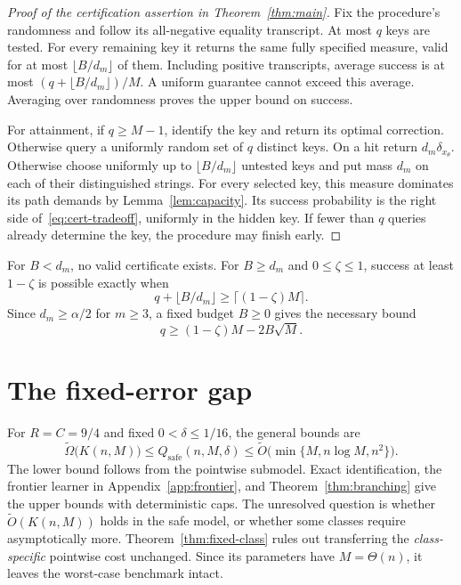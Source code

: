 \documentclass[11pt]{article}
\theoremstyle{definition}\newtheorem{definition}[theorem]{Definition}
\theoremstyle{remark}\newtheorem{remark}[theorem]{Remark}
\begin{document}
\begin{proof}[Proof of the certification assertion in Theorem~\ref{thm:main}]
Fix the procedure's randomness and follow its all-negative equality transcript. At most $q$ keys are tested. For every remaining key it returns the same fully specified measure, valid for at most $\lfloor B/d_m\rfloor$ of them. Including positive transcripts, average success is at most $(q+\lfloor B/d_m\rfloor)/M$. A uniform guarantee cannot exceed this average. Averaging over randomness proves the upper bound on success.

For attainment, if $q\ge M-1$, identify the key and return its optimal correction. Otherwise query a uniformly random set of $q$ distinct keys. On a hit return $d_m\delta_{x_\theta}$. Otherwise choose uniformly up to $\lfloor B/d_m\rfloor$ untested keys and put mass $d_m$ on each of their distinguished strings. For every selected key, this measure dominates its path demands by Lemma~\ref{lem:capacity}. Its success probability is the right side of~\eqref{eq:cert-tradeoff}, uniformly in the hidden key. If fewer than $q$ queries already determine the key, the procedure may finish early.
\end{proof}

For $B<d_m$, no valid certificate exists. For $B\ge d_m$ and $0\le\zeta\le1$, success at least $1-\zeta$ is possible exactly when
\[
 q+\lfloor B/d_m\rfloor\ge\lceil(1-\zeta)M\rceil.
\]
Since $d_m\ge\alpha/2$ for $m\ge3$, a fixed budget $B\ge0$ gives the necessary bound
\begin{equation}\label{eq:fixed-B}
 q\ge(1-\zeta)M-2B\sqrt M.
\end{equation}




\section{The fixed-error gap}\label{sec:remaining}
For $R=C=9/4$ and fixed $0<\delta\le1/16$, the general bounds are
\begin{equation}\label{eq:fixed-gap}
 \widetilde\Omega\bigl(K(n,M)\bigr)
 \le Q_{\mathrm{safe}}(n,M,\delta)
 \le\widetilde O\bigl(\min\{M,n\log M,n^2\}\bigr).
\end{equation}
The lower bound follows from the pointwise submodel. Exact identification, the frontier learner in Appendix~\ref{app:frontier}, and Theorem~\ref{thm:branching} give the upper bounds with deterministic caps. The unresolved question is whether $\widetilde O(K(n,M))$ holds in the safe model, or whether some classes require asymptotically more. Theorem~\ref{thm:fixed-class} rules out transferring the \emph{class-specific} pointwise cost unchanged. Since its parameters have $M=\Theta(n)$, it leaves the worst-case benchmark intact.
\end{document}
